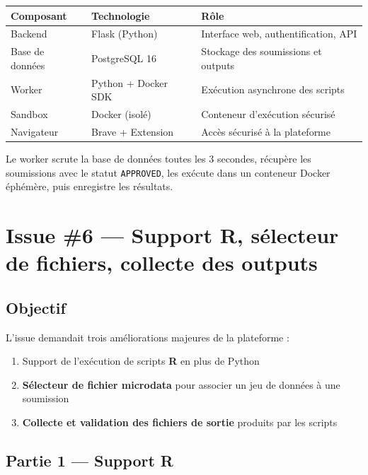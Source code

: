 \documentclass[12pt,a4paper]{article}
\begin{document}
\begin{center}
\begin{tabular}{|l|l|l|}
\hline
\textbf{Composant} & \textbf{Technologie} & \textbf{Rôle} \\
\hline
Backend & Flask (Python) & Interface web, authentification, API \\
Base de données & PostgreSQL 16 & Stockage des soumissions et outputs \\
Worker & Python + Docker SDK & Exécution asynchrone des scripts \\
Sandbox & Docker (isolé) & Conteneur d'exécution sécurisé \\
Navigateur & Brave + Extension & Accès sécurisé à la plateforme \\
\hline
\end{tabular}
\end{center}

\vspace{0.5cm}

Le worker scrute la base de données toutes les 3 secondes, récupère les soumissions avec le statut \texttt{APPROVED}, les exécute dans un conteneur Docker éphémère, puis enregistre les résultats.

\section{Issue \#6 — Support R, sélecteur de fichiers, collecte des outputs}

\subsection{Objectif}

L'issue demandait trois améliorations majeures de la plateforme :
\begin{enumerate}
  \item Support de l'exécution de scripts \textbf{R} en plus de Python
  \item \textbf{Sélecteur de fichier microdata} pour associer un jeu de données à une soumission
  \item \textbf{Collecte et validation des fichiers de sortie} produits par les scripts
\end{enumerate}

\subsection{Partie 1 — Support R}
\end{document}
